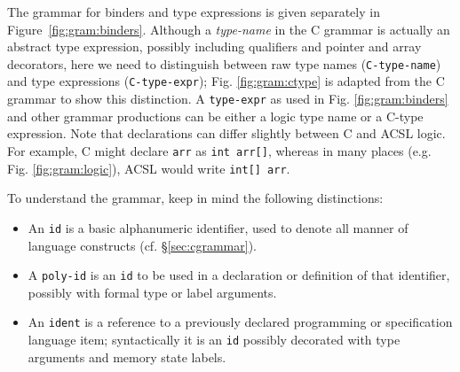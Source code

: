  The grammar
for binders and type expressions is given separately in
Figure~\ref{fig:gram:binders}. 
Although a \textit{type-name} in the C grammar is actually an abstract type expression, possibly including qualifiers and pointer and array decorators,
here we need to distinguish between raw type names (\lstinline|C-type-name|) and type expressions (\lstinline|C-type-expr|); Fig. \ref{fig:gram:ctype} is adapted from the C grammar to show this distinction.
A \lstinline|type-expr| as used in Fig. \ref{fig:gram:binders} and other grammar productions can be
either a logic type name or a C-type expression. 
Note that declarations can differ slightly between C and ACSL logic. For example, C might declare \lstinline|arr| as
\lstinline|int arr[]|, whereas in many places (e.g. Fig. \ref{fig:gram:logic}), ACSL would write \lstinline|int[] arr|.

To understand the grammar, keep in mind the following distinctions:
\begin{itemize}
\item An \lstinline|id| is a basic alphanumeric identifier, used to denote all manner of language constructs (cf. \S\ref{sec:cgrammar}).
\item A \lstinline|poly-id| is an \lstinline|id| to be used in a declaration or definition of that identifier, possibly with formal type or label arguments.
\item An \lstinline|ident| is a reference to a previously declared programming or specification language item; syntactically it is an \lstinline|id| possibly decorated with type arguments and memory state labels.
\end{itemize}

